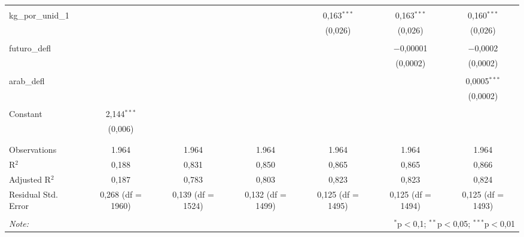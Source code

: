 \begin{table}[!htbp]
\begin{tabular}{@{\extracolsep{5pt}}lcccccc}
  & & & & & & \\ 
 kg\_por\_unid\_1 &  &  &  & 0,163$^{***}$ & 0,163$^{***}$ & 0,160$^{***}$ \\ 
  &  &  &  & (0,026) & (0,026) & (0,026) \\ 
  & & & & & & \\ 
 futuro\_defl &  &  &  &  & $-$0,00001 & $-$0,0002 \\ 
  &  &  &  &  & (0,0002) & (0,0002) \\ 
  & & & & & & \\ 
 arab\_defl &  &  &  &  &  & 0,0005$^{***}$ \\ 
  &  &  &  &  &  & (0,0002) \\ 
  & & & & & & \\ 
 Constant & 2,144$^{***}$ &  &  &  &  &  \\ 
  & (0,006) &  &  &  &  &  \\ 
  & & & & & & \\ 
\hline \\[-1.8ex] 
Observations & 1.964 & 1.964 & 1.964 & 1.964 & 1.964 & 1.964 \\ 
R$^{2}$ & 0,188 & 0,831 & 0,850 & 0,865 & 0,865 & 0,866 \\ 
Adjusted R$^{2}$ & 0,187 & 0,783 & 0,803 & 0,823 & 0,823 & 0,824 \\ 
Residual Std. Error & 0,268 (df = 1960) & 0,139 (df = 1524) & 0,132 (df = 1499) & 0,125 (df = 1495) & 0,125 (df = 1494) & 0,125 (df = 1493) \\ 
\hline 
\hline \\[-1.8ex] 
\textit{Note:}  & \multicolumn{6}{r}{$^{*}$p$<$0,1; $^{**}$p$<$0,05; $^{***}$p$<$0,01} \\ 
\end{tabular} 
\end{table} 
